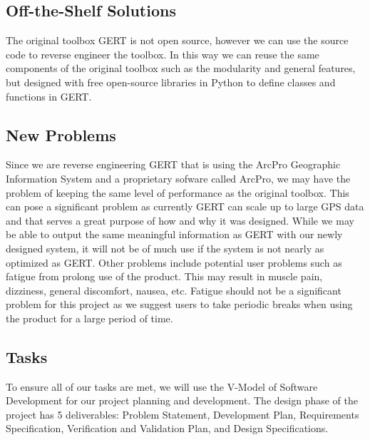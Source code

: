 \documentclass[12pt, titlepage]{article}
\begin{document}
\subsection{Off-the-Shelf Solutions}
The original toolbox GERT is not open source, however we can use the source code to reverse engineer the toolbox. In this way we can reuse the same components of the original toolbox such as the modularity and general features, but designed with free open-source libraries in Python to define classes and functions in GERT.

\subsection{New Problems}
Since we are reverse engineering GERT that is using the ArcPro Geographic Information System and a proprietary sofware called ArcPro, we may have the problem of keeping the
same level of performance as the original toolbox. This can pose a significant problem as currently GERT can scale up to large GPS data and that serves a great purpose of how and why
it was designed. While we may be able to output the same meaningful information as GERT with our newly designed system, it will not be of much use if the system is not nearly as optimized
as GERT. 
Other problems include potential user problems such as fatigue from prolong use of the product. This may result in muscle pain, dizziness, general discomfort, nausea, etc. Fatigue should not be a significant problem for this project as we suggest users to take periodic breaks when using the product for a large period of time.

\subsection{Tasks}
To ensure all of our tasks are met, we will use the V-Model of Software Development for our project planning and development. The design phase of the project has 5 deliverables: Problem Statement, Development Plan, Requirements Specification, Verification and Validation Plan, and Design Specifications.
\end{document}
